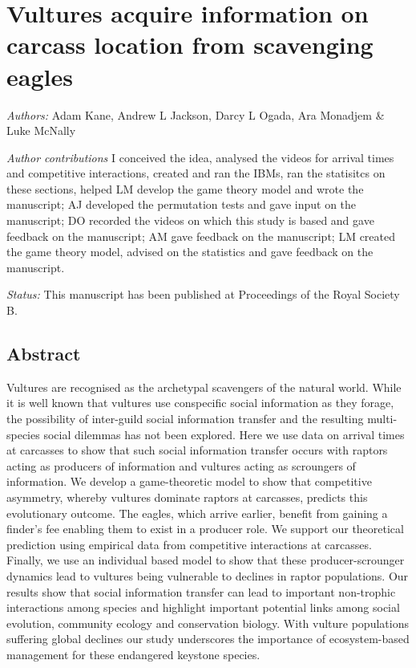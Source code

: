\chapter{Vultures acquire information on carcass location from scavenging eagles}
\label{chap:scrounger}

\textit{Authors:} Adam Kane, Andrew L Jackson, Darcy L Ogada, Ara Monadjem \& Luke McNally

\vspace{10 mm}
\noindent
\textit{\uppercase{A}uthor contributions} 
I conceived the idea, analysed the videos for arrival times and competitive interactions, created and ran the IBMs, ran the statisitcs on these sections, helped LM develop the game theory model and wrote the manuscript; 
AJ developed the permutation tests and gave input on the manuscript; DO recorded the videos on which this study is based and gave feedback on the manuscript; AM gave feedback on the manuscript; LM created the game theory model, advised on the statistics and gave feedback on the manuscript.

\vspace{10 mm}

\noindent
\textit{Status:} This manuscript has been published at Proceedings of the Royal Society B.

\newpage

\noindent

\section{\uppercase{A}bstract}

Vultures are recognised as the archetypal scavengers of the natural world. While it is well known that vultures use conspecific social information as they forage, the possibility of inter-guild social information transfer and the resulting multi-species social dilemmas has not been explored. Here we use data on arrival times at carcasses to show that such social information transfer occurs with raptors acting as producers of information and vultures acting as scroungers of information. We develop a game-theoretic model to show that competitive asymmetry, whereby vultures dominate raptors at carcasses, predicts this evolutionary outcome. The eagles, which arrive earlier, benefit from gaining a finder's fee enabling them to exist in a producer role. We support our theoretical prediction using empirical data from competitive interactions at carcasses. Finally, we use an individual based model to show that these producer-scrounger dynamics lead to vultures being vulnerable to declines in raptor populations. Our results show that social information transfer can lead to important non-trophic interactions among species and highlight important potential links among social evolution, community ecology and conservation biology. With vulture populations suffering global declines our study underscores the importance of ecosystem-based management for these endangered keystone species. 
\newpage

